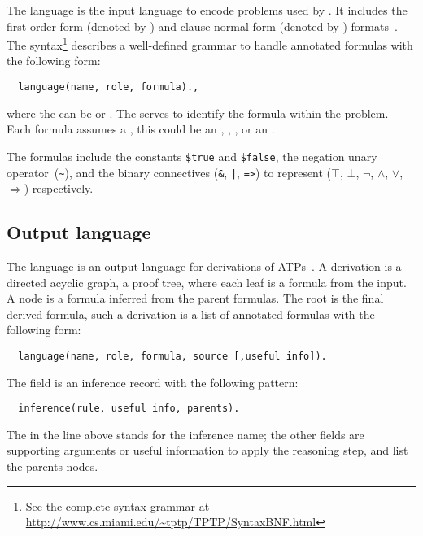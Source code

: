 \documentclass[../main.tex]{subfiles}
\begin{document}
The \TPTP language is the input language to encode problems used by \Metis.
It includes the first-order form (denoted by ) and clause normal
form (denoted by ) formats~\cite{sutcliffe2009}.
The \TPTP syntax\footnote{See the complete syntax grammar
at \url{http://www.cs.miami.edu/~tptp/TPTP/SyntaxBNF.html}} describes a
well-defined grammar to handle annotated formulas with the following form:

\begin{verbatim}
  language(name, role, formula).,
\end{verbatim}

where the  can be  or . The
 serves to identify the formula within the problem. Each
formula assumes a , this could be an ,
, ,  or an
.

The formulas include the constants
\verb!$true! and \verb!$false!, the negation unary
operator~(\verb!~!), and the binary connectives
(\verb!&!, \verb!|!, \verb!=>!) to represent
($⊤$, $⊥$, $¬$, $∧$, $∨$, $⇒$) respectively.

\subsection{Output language}
\label{ssec:output-language}

The \TSTP language is an output language for derivations of
ATPs~\cite{Sutcliffe-Schulz-Claessen-VanGelder-2006}.
A \TSTP derivation is a directed acyclic graph, a proof tree,
where each leaf is a formula from the \TPTP input. A node is a formula
inferred from the parent formulas. The root is the final derived formula,
such a derivation is a list of annotated formulas with the following form:

\begin{verbatim}
  language(name, role, formula, source [,useful info]).
\end{verbatim}

The  field is an inference record with the following
pattern:

\begin{verbatim}
  inference(rule, useful info, parents).
\end{verbatim}

The  in the line above stands for the inference name;
the other fields are supporting arguments or useful information to
apply the reasoning step, and list the parents nodes.
\end{document}
